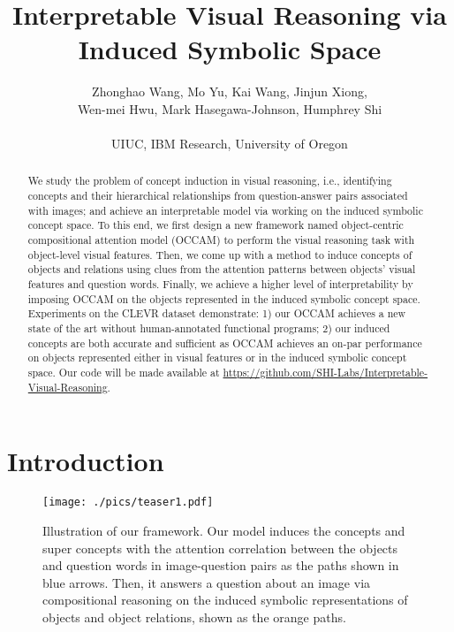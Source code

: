 \documentclass[final]{cvpr}
\begin{document}
\title{Interpretable Visual Reasoning via Induced Symbolic Space}

\author{Zhonghao Wang, Mo Yu, Kai Wang,
Jinjun Xiong, \\Wen-mei Hwu, Mark Hasegawa-Johnson, Humphrey Shi\\
\\
{\small UIUC, IBM Research, University of Oregon}}

\maketitle

\vspace{-3mm}
\begin{abstract}


We study the problem of concept induction in visual reasoning, i.e., identifying concepts and their hierarchical relationships from question-answer pairs associated with images; and achieve an interpretable model via working on the induced symbolic concept space.
To this end, we first design a new framework named object-centric compositional attention model (OCCAM) to perform the visual reasoning task with object-level visual features. Then, we come up with a method to induce concepts of objects and relations using clues from the attention patterns between objects' visual features and question words.
Finally, we achieve a higher level of interpretability by imposing OCCAM on the objects represented in the induced symbolic concept space.
Experiments on the CLEVR dataset demonstrate: 1) our OCCAM achieves a new state of the art without human-annotated functional programs; 2) our induced concepts are both accurate and sufficient as OCCAM achieves an on-par performance on objects represented either in visual features or in the induced symbolic concept space.
Our code will be made available at \href{https://github.com/SHI-Labs/Interpretable-Visual-Reasoning}{https://github.com/SHI-Labs/Interpretable-Visual-Reasoning}.
\vspace{-3mm}
\end{abstract}

\section{Introduction}

\begin{figure}[t]
\centering
\texttt{[image: ./pics/teaser1.pdf]}
\caption{Illustration of our framework. Our model induces the concepts and super concepts with the attention correlation between the objects and question words in image-question pairs as the paths shown in blue arrows. Then, it answers a question about an image via compositional reasoning on the induced symbolic representations of objects and object relations, shown as the orange paths.}
\label{teaser}
\vspace{-3mm}
\end{figure}
\end{document}
